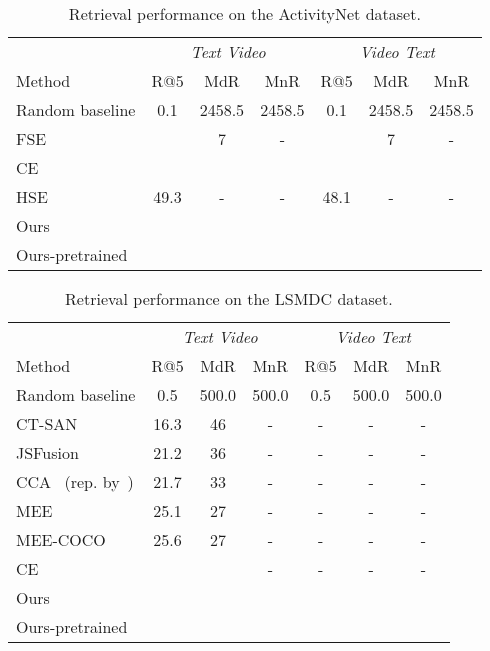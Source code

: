 \documentclass[runningheads]{llncs}
\begin{document}
\begin{table}[h!]
\begin{center}
\caption{Retrieval performance on the ActivityNet dataset.}
\label{table:ANet_results}
\scriptsize
\begin{tabular}{l | @{\hskip -0.35cm}c @{\hskip -0.35cm}c @{\hskip -0.35cm}c | @{\hskip -0.35cm}c @{\hskip -0.35cm}c @{\hskip -0.35cm}c}
\hline
\multicolumn{1}{c}{} & \multicolumn{3}{c}{\textit{Text  Video}} & \multicolumn{3}{c}{\textit{Video  Text}} \\
Method & R@5 & MdR & MnR & R@5 & MdR & MnR \\
\hline
Random baseline & 0.1 & 2458.5 & 2458.5 & 0.1 & 2458.5 & 2458.5 \\
FSE~\cite{zhang2018HSE} &  & 7 & - &  & 7 & - \\
CE~\cite{liu2019use} &  &  &  &  &  &  \\
HSE~\cite{zhang2018HSE}& 49.3 & - & - & 48.1 & - & - \\
Ours &  &  &  &  &  &  \\
\hline
Ours-pretrained &  &  &  &  &  &  \\
\hline
\end{tabular}
\end{center}
\end{table}

\begin{table}[h!]
\begin{center}
\caption{Retrieval performance on the LSMDC dataset.}
\label{table:LSMDC_results}
\scriptsize
\begin{tabular}{l | @{\hskip -0.35cm}c @{\hskip -0.35cm}c @{\hskip -0.35cm}c | @{\hskip -0.35cm}c @{\hskip -0.35cm}c @{\hskip -0.35cm}c}
\hline
\multicolumn{1}{c}{} & \multicolumn{3}{c}{\textit{Text  Video}} & \multicolumn{3}{c}{\textit{Video  Text}} \\
Method & R@5 & MdR & MnR & R@5 & MdR & MnR \\
\hline
Random baseline & 0.5 & 500.0 & 500.0 & 0.5 & 500.0 & 500.0 \\
CT-SAN~\cite{Yu2016CT-SAN} & 16.3 & 46 & - & - & - & - \\
JSFusion~\cite{Yu2018JSFusion} & 21.2 & 36 & - & - & - & - \\
CCA~\cite{Klein2015CCA} (rep. by~\cite{miech2018learning}) & 21.7 & 33 & - & - & - & - \\
MEE~\cite{miech2018learning} & 25.1 & 27 & - & - & - & - \\
MEE-COCO~\cite{miech2018learning} & 25.6 & 27 & - & - & - & - \\
CE~\cite{liu2019use} &  &  & - & - & - & - \\
Ours &  &  &  &  &  &  \\
\hline
Ours-pretrained &  &  &  &  &  &  \\
\hline
\end{tabular}
\end{center}
\end{table} 
\end{document}
